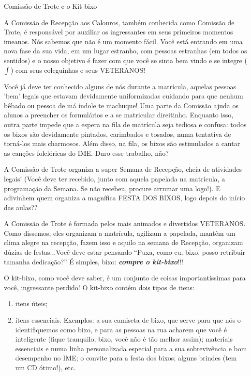 \begin{secao}{Comissão de Trote e o Kit-bixo}

A Comissão de Recepção aos Calouros, também conhecida como Comissão de Trote,
é responsável por auxiliar os ingressantes em seus primeiros momentos imeanos.
Nós sabemos que não é um momento fácil. Você está entrando em uma nova fase da
sua vida, em um lugar estranho, com pessoas estranhas (em todos os sentidos) e
o nosso objetivo é fazer com que você se sinta bem vindo e se integre ($\int$)
com seus coleguinhas e seus VETERANOS!

Você já deve ter conhecido alguns de nós durante a matrícula, aquelas pessoas
'bem' legais que estavam devidamente uniformizadas cuidando para que nenhum
bêbado ou pessoa de má índole te machuque! Uma parte da Comissão ajuda os
alunos a preencher os formulários e a se matricular direitinho. Enquanto isso,
outra parte impede que a espera na fila de matrícula seja tediosa e confusa:
todos os bixos são devidamente pintados, carimbados e tosados, numa tentativa
de torná-los mais charmosos. Além disso, na fila, os bixos são estimulados a
cantar as canções folclóricas do IME. Duro esse trabalho, não?

A Comissão de Trote organiza a super Semana de Recepção, cheia de atividades
legais! (Você deve ter recebido, junto com aquela papelada na matrícula, a
programação da Semana. Se não recebeu, procure arrumar uma logo!).
E adivinhem quem organiza a magnífica FESTA DOS BIXOS, logo depois do início
das aulas??

A Comissão de Trote é formada pelos mais animados e divertidos VETERANOS. Como
dissemos, eles organizam a matrícula, agilizam a papelada, mantêm um clima
alegre na recepção, fazem isso e aquilo na semana de Recepção, organizam dúzias
de festas...Você deve estar pensando ``Puxa, como eu, bixo, posso retribuir
tamanha dedicação?'' É simples, bixo: {\bf\em compre o kit-bixo}!!!

O kit-bixo, como você deve saber, é um conjunto de coisas importantíssimas
para você, ingressante perdido! O kit-bixo contém dois tipos de itens:
\begin{enumerate}

\item itens úteis;
\item itens essenciais. Exemplos: a sua camiseta de bixo, que serve para que
nós o identifiquemos como bixo, e para as pessoas na rua acharem que você é
inteligente (fique tranquilo, bixo, você não é tão melhor assim); materiais
essenciais e numa linha personalizada especial para a sua sobrevivência e bom
desempenho no IME; o convite para a festa dos bixos; alguns brindes (tem um
CD ótimo!), etc.


\end{enumerate}
\end{secao}
